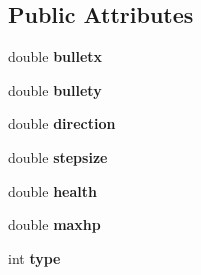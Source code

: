 \subsection*{Public Attributes}
\begin{DoxyCompactItemize}
\item 
\hypertarget{classBullet_a6b8b1b31df24e9dac1536b6a7f68bc5b}{double {\bfseries bulletx}}\label{classBullet_a6b8b1b31df24e9dac1536b6a7f68bc5b}

\item 
\hypertarget{classBullet_a2f67299616d8d392338821e3f0f95b7e}{double {\bfseries bullety}}\label{classBullet_a2f67299616d8d392338821e3f0f95b7e}

\item 
\hypertarget{classBullet_ad5ec403011027c1bac397cf4c0fa8645}{double {\bfseries direction}}\label{classBullet_ad5ec403011027c1bac397cf4c0fa8645}

\item 
\hypertarget{classBullet_a6fa1a10a5fc83d1fdf5045c9a423cf5d}{double {\bfseries stepsize}}\label{classBullet_a6fa1a10a5fc83d1fdf5045c9a423cf5d}

\item 
\hypertarget{classBullet_a8ce85ac03f19e14634608fdf30b332f5}{double {\bfseries health}}\label{classBullet_a8ce85ac03f19e14634608fdf30b332f5}

\item 
\hypertarget{classBullet_a12eac3189b24a4a60ce44e9206a119cc}{double {\bfseries maxhp}}\label{classBullet_a12eac3189b24a4a60ce44e9206a119cc}

\item 
\hypertarget{classBullet_a36ce6ac6de111da7e7b798eca40e47e6}{int {\bfseries type}}\label{classBullet_a36ce6ac6de111da7e7b798eca40e47e6}

\end{DoxyCompactItemize}


